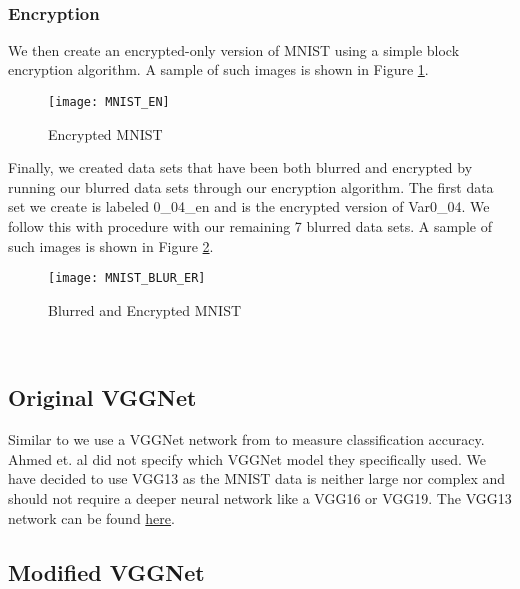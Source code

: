 \documentclass[12pt, titlepage]{article}
\begin{document}
~\newpage
\subsubsection{Encryption}\label{EncryptionMethodology}

\noindent We then create an encrypted-only version of MNIST using a simple block encryption algorithm. A sample of such images is shown in Figure \ref{MNIST_ENCRYPTED}.\\

\begin{figure}[h!]
	\begin{center}
		\texttt{[image: MNIST\_EN]}
		\caption{Encrypted MNIST}
		\label{MNIST_ENCRYPTED}
	\end{center}
\end{figure}

\noindent Finally, we created data sets that have been both blurred and encrypted by running our blurred data sets through our encryption algorithm. 
The first data set we create is labeled 0\_04\_en and is the encrypted version of Var0\_04. We follow this with procedure with our remaining 7 blurred data sets. A sample of such images is shown in Figure \ref{MNIST_BLURRED_EN}.\\

\begin{figure}[h!]
	\begin{center}
		\texttt{[image: MNIST\_BLUR\_ER]}
		\caption{Blurred and Encrypted MNIST}
		\label{MNIST_BLURRED_EN}
	\end{center}
\end{figure} 
 
~\newpage 
\subsection{Original VGGNet} 

\noindent Similar to \cite{ahmed2018obfuscated} we use a VGGNet network from \cite{simonyan2014very} to measure classification accuracy. Ahmed et. al did not specify which VGGNet model they specifically used. We have decided to use VGG13 as the MNIST data is neither large nor complex and should not require a deeper neural network like a VGG16 or VGG19. The VGG13 network can be found 
\href{https://github.com/peter-michalski/CAS771/blob/master/python/VGG/MYinitial_VGG.py}{here}.\\

\subsection{Modified VGGNet} 
\end{document}
